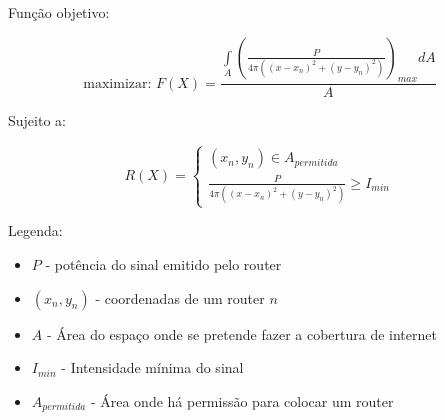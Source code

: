 \documentclass[11pt,a4paper]{article}
\begin{document}
Função objetivo:

$$
\text{maximizar: } 
F(X) = \frac{
\displaystyle\int\limits_A
\left(
\frac{P}{4 \pi \left( ( x-x_n ) ^2 + ( y-y_n ) ^2 \right) } 
\right)_{max} dA }{A}
$$

Sujeito a:

$$
R(X) = \left
\{ \begin{matrix} 
(x_n,y_n) \in A_{permitida} \\ 
\frac{P}{4 \pi \left( ( x-x_n ) ^2 + ( y-y_n ) ^2 \right) } \geq I_{min} \end{matrix} 
\right.
$$


Legenda:
\begin{itemize}
\item $P$ - potência do sinal emitido pelo router
\item $(x_n,y_n)$ - coordenadas de um router $n$
\item $A$ - Área do espaço onde se pretende fazer a cobertura de internet
\item $I_{min}$ - Intensidade mínima do sinal
\item $A_{permitida}$ - Área onde há permissão para colocar um router
\end{itemize}
\end{document}
